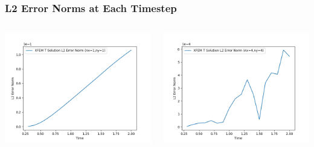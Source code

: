 \documentclass[]{beamer}
\begin{document}
\begin{frame}[t]\frametitle{L2 Error Norms at Each Timestep}
  	\begin{columns}
			\begin{center}
			\includegraphics[scale=0.4]{figures/2D_xy_ls1mat_nx1ny1_L2_Errs}
			\end{center}
			\begin{center}
			\includegraphics[scale=0.4]{figures/2D_xy_ls1mat_nx4ny4_L2_Errs}
			\end{center}
	\end{columns}
\end{frame}
\end{document}

